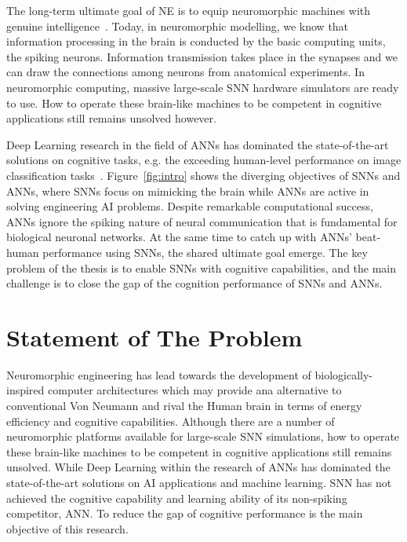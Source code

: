 The long-term ultimate goal of NE is to equip neuromorphic machines with genuine intelligence~\cite{konar1999artificial}.
Today, in neuromorphic modelling, we know that information processing in the brain is conducted by the basic computing units, the spiking neurons.
Information transmission takes place in the synapses and we can draw the connections among neurons from anatomical experiments.
In neuromorphic computing, massive large-scale SNN hardware simulators are ready to use.
How to operate these brain-like machines to be competent in cognitive applications still remains unsolved however.

Deep Learning research in the field of ANNs has dominated the state-of-the-art solutions on cognitive tasks, e.g. the exceeding human-level performance on image classification tasks~\cite{he2015delving}.
Figure~\ref{fig:intro} shows the diverging objectives of SNNs and ANNs, where SNNs focus on mimicking the brain while ANNs are active in solving engineering AI problems.
Despite remarkable computational success, ANNs ignore the spiking nature of neural communication that is fundamental for biological neuronal networks.
At the same time to catch up with ANNs' beat-human performance using SNNs, the shared ultimate goal emerge.
The key problem of the thesis is to enable SNNs with cognitive capabilities, and the main challenge is to close the gap of the cognition performance of SNNs and ANNs.




\section{Statement of The Problem}
\label{sec:problem}
Neuromorphic engineering has lead towards the development of biologically-inspired computer architectures which may provide ana alternative to conventional Von Neumann and rival the Human brain in terms of energy efficiency and cognitive capabilities.
Although there are a number of neuromorphic platforms available for large-scale SNN simulations, how to operate these brain-like machines to be competent in cognitive applications still remains unsolved.
While Deep Learning within the research of ANNs has dominated the state-of-the-art solutions on AI applications and machine learning.
SNN has not achieved the cognitive capability and learning ability of its non-spiking competitor, ANN.
To reduce the gap of cognitive performance is the main objective of this research.


